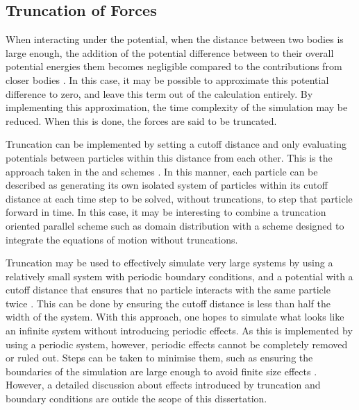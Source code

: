 \subsection{Truncation of Forces}

%
When interacting under the \LennardJones{} potential,
when the distance between two bodies is large enough,
the addition of the potential difference between to their overall
potential energies them becomes negligible compared
to the contributions from closer bodies
\cite[p.~35]{frenkel2001understanding}.
%
In this case, it may be possible to approximate this potential difference
to zero, and leave this term out of the calculation entirely.
%
By implementing this approximation,
the time complexity of the simulation may be reduced.
%
When this is done, the forces are said to be truncated.

%
Truncation can be implemented by
setting a cutoff distance and only evaluating potentials
between particles within this distance from each other.
%
This is the approach taken in the \verletlist{} and \celllist{} schemes
\cite[p.~545]{frenkel2001understanding}.
%
In this manner, each particle can be described as generating its own
isolated system of particles within its cutoff distance
at each time step
to be solved, without truncations, to step that particle forward in time.
%
In this case, it may be interesting to combine a truncation oriented
parallel scheme such as domain distribution with a scheme designed to integrate
the equations of motion without truncations.

%
Truncation may be used to effectively simulate very large systems by using
a relatively small system with periodic boundary conditions,
and a potential with a cutoff distance that ensures that
no particle interacts with the same particle twice
\cite[p.~35]{frenkel2001understanding}.
%
This can be done by ensuring the cutoff distance is less than half the width
of the system.
%
With this approach, one hopes to simulate what looks like an infinite system
without introducing periodic effects.
%
As this is implemented by using a periodic system, however,
periodic effects cannot be completely removed or ruled out.
%
Steps can be taken to minimise them, such as ensuring the boundaries
of the simulation are large enough to avoid finite size effects
\cite[p.~220]{frenkel2001understanding}.
%
However, a detailed discussion about effects introduced by
truncation and boundary conditions are outide the scope of
this dissertation.

